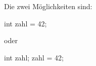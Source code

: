         Die zwei Möglichkeiten sind:
        \begin{code}[numbers=none]
            int zahl = 42;
        \end{code}
        oder
        \begin{code}[numbers=none]
            int zahl;
            zahl = 42;
        \end{code}
